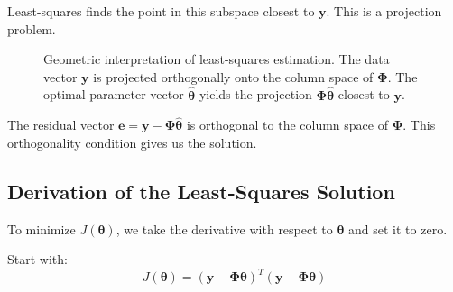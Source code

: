 Least-squares finds the point in this subspace closest to $\mathbf{y}$. This is a projection problem.

\begin{figure}[h]
\centering
{}
\caption{Geometric interpretation of least-squares estimation. The data vector $\mathbf{y}$ is projected orthogonally onto the column space of $\mathbf{\Phi}$. The optimal parameter vector $\hat{\boldsymbol{\theta}}$ yields the projection $\mathbf{\Phi}\hat{\boldsymbol{\theta}}$ closest to $\mathbf{y}$.}
\label{fig:least_squares_geometry}
\end{figure}

The residual vector $\mathbf{e} = \mathbf{y} - \mathbf{\Phi}\hat{\boldsymbol{\theta}}$ is orthogonal to the column space of $\mathbf{\Phi}$. This orthogonality condition gives us the solution.

\subsection{Derivation of the Least-Squares Solution}

To minimize $J(\boldsymbol{\theta})$, we take the derivative with respect to $\boldsymbol{\theta}$ and set it to zero.

Start with:
\begin{equation}
J(\boldsymbol{\theta}) = (\mathbf{y} - \mathbf{\Phi}\boldsymbol{\theta})^T (\mathbf{y} - \mathbf{\Phi}\boldsymbol{\theta})
\end{equation}

